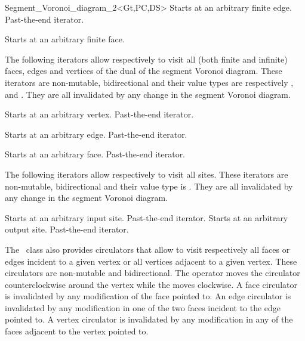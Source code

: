 \begin{ccRefClass}{Segment_Voronoi_diagram_2<Gt,PC,DS>}
{Starts at an arbitrary finite edge.}
\ccGlue
{}
{Past-the-end iterator.}

{Starts at an arbitrary finite face.}
\ccGlue
{}

The following iterators allow respectively to visit all
(both finite and infinite) faces, edges and vertices
of the dual of the segment Voronoi diagram. These iterators are
non-mutable, bidirectional and their value types are respectively
,  and . 
They are all invalidated by any change in the segment Voronoi diagram.


{Starts at an arbitrary  vertex.}
\ccGlue
{}
{Past-the-end iterator.}

{Starts at an arbitrary edge.}
\ccGlue
{}
{Past-the-end iterator.}

{Starts at an arbitrary face.}
\ccGlue
{}
{Past-the-end iterator.}




The following iterators allow respectively to visit 
all sites. These iterators are non-mutable, bidirectional and their
value type is . They are all invalidated by any change in
the segment Voronoi diagram.


{Starts at an arbitrary input site.}
\ccGlue
{}
{Past-the-end iterator.}
\ccGlue
{}
{Starts at an arbitrary output site.}
\ccGlue
{}
{Past-the-end iterator.}


\ccThreeToTwo




The \ccRefName\ class also provides circulators that allow to visit
respectively all faces or edges incident to a given vertex or all
vertices adjacent to a given vertex. These circulators are non-mutable
and bidirectional. The operator  moves the circulator
counterclockwise around the vertex while the  moves
clockwise. A face circulator is invalidated by any modification of the
face pointed to. An edge circulator is invalidated by any modification
in one of the two faces incident to the edge pointed to. A vertex
circulator is invalidated by any modification in any of the faces
adjacent to the vertex pointed to.


\end{ccRefClass}
